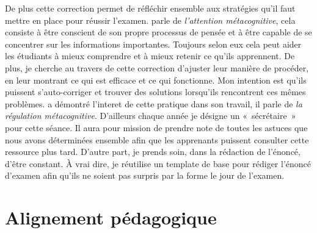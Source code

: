 De plus cette correction permet de réfléchir ensemble aux stratégies qu'il faut mettre en place pour réussir l'examen. \citet{winne1998studying} parle de \emph{l'attention métacognitive}, cela consiste à être conscient de son propre processus de pensée et à être capable de se concentrer sur les informations importantes. Toujours selon eux cela peut aider les étudiants à mieux comprendre et à mieux retenir ce qu'ils apprennent. De plus, je cherche au travers de cette correction d'ajuster leur manière  de procéder, en leur montrant ce qui est efficace et ce qui fonctionne. Mon intention est qu'ils puissent s'auto-corriger et trouver des solutions lorsqu'ils rencontrent ces mêmes problèmes. \citet{zimmerman1986becoming} a démontré l'interet de cette pratique dans son travail, il parle de \emph{la régulation métacognitive}.
D'ailleurs chaque année je désigne un «~sécrétaire~» pour cette séance. Il aura pour mission de prendre note de toutes les astuces que nous avons déterminées ensemble afin que les apprenants puissent consulter cette ressource plus tard. D'autre part, je prends soin, dans la rédaction de l'énoncé, d'être constant. À vrai dire, je réutilise un template de base pour rédiger l'énoncé d’examen afin qu’ils ne soient pas surpris par la forme le jour de l'examen.


\clearpage
\section{Alignement pédagogique}


